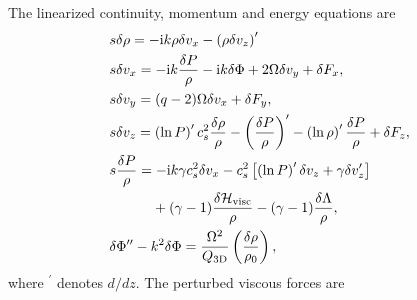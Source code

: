 The linearized continuity, momentum and energy equations are
\begin{align}
   &s \delta \rho = - \ii k \rho\delta v_x -
  \left(\rho\delta v_z\right)^\prime \label{lin_mass} \\ 
   &s  \delta v_x = - \ii k\frac{\delta P}{\rho} - \ii k \delta 
  \Phi + 2\Omega \delta v_y + \delta F_x,\\
   &s \delta v_y = (q-2)\Omega\delta v_x + \delta F_y,\\
  &s \delta v_z =
  \left(\ln{P}\right)^\prime c_s^2\frac{\delta\rho}{\rho} -
  \left(\frac{\delta P}{\rho}\right)^\prime -
  \left(\ln{\rho}\right)^\prime\frac{\delta P}{\rho} + \delta F_z, \\ 
  &s \frac{\delta P}{\rho} = 
 - \ii k \gamma c_s^2\delta v_x
- c_s^2\left[
 \left(\ln{P}\right)^\prime\delta v_z + 
  \gamma\delta v_z^\prime\right] \notag\\
   & \phantom{s \frac{\delta P}{\rho}=}
  + (\gamma-1)\frac{\delta\mathcal{H}_\mathrm{visc}}{\rho} 
  -(\gamma-1)\frac{\delta\Lambda}{\rho}
  \label{lin_energy},\\
  &\delta\Phi^{\prime\prime} - k^2\delta\Phi =
  \frac{\Omega^2}{Q_\mathrm{3D}}\left(\frac{\delta\rho}{\rho_0}\right)\label{lin_gravity},  
\end{align}
where $^\prime$ denotes $d/dz$. The perturbed viscous forces are 
